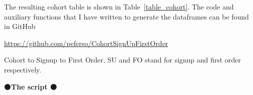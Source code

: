 \documentclass[12pt,aps,prd,amsmath,amssymb,floatfix,nofootinbib,reprint]{article}
\begin{document}
The resulting cohort table is shown in Table~\ref{table_cohort}.
The code and auxiliary functions that I have written to generate
the dataframes can be found in GitHub 
\begin{center}
      \url{https://github.com/peferso/CohortSignUpFirstOrder}
\end{center}

\begin{table}[ht!]
      \centering
       
      \caption{Cohort to Signup to First Order. SU and FO stand for signup and first order respectively.
      \label{table_cohort}}
\end{table}

\newpage
\begin{center}
      {\large \bf $\medbullet$\hfill The script \hfill $\medbullet$ \bf}
\end{center}
\end{document}
